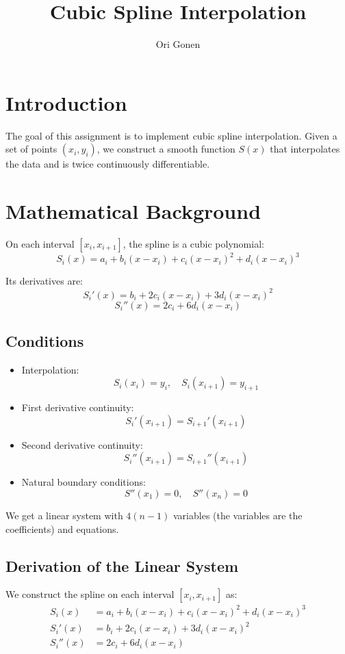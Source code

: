 \documentclass[a4paper,11pt]{article}
\title{Cubic Spline Interpolation}
\author{Ori Gonen}
\date{}
\begin{document}
\maketitle

\section{Introduction}

The goal of this assignment is to implement cubic spline interpolation. Given a set of points $(x_i, y_i)$, we construct a smooth function $S(x)$ that interpolates the data and is twice continuously differentiable.
\section{Mathematical Background}

On each interval $[x_i, x_{i+1}]$, the spline is a cubic polynomial:
\[
S_i(x) = a_i + b_i (x - x_i) + c_i (x - x_i)^2 + d_i (x - x_i)^3
\]

Its derivatives are:
\[
S_i'(x) = b_i + 2c_i(x - x_i) + 3d_i(x - x_i)^2
\]
\[
S_i''(x) = 2c_i + 6d_i(x - x_i)
\]

\subsection*{Conditions}
\begin{itemize}
    \item Interpolation:
    \[
    S_i(x_i) = y_i, \quad S_i(x_{i+1}) = y_{i+1}
    \]

    \item First derivative continuity:
    \[
    S_i'(x_{i+1}) = S_{i+1}'(x_{i+1})
    \]

    \item Second derivative continuity:
    \[
    S_i''(x_{i+1}) = S_{i+1}''(x_{i+1})
    \]

    \item Natural boundary conditions:
    \[
    S''(x_1) = 0, \quad S''(x_n) = 0
    \]
\end{itemize}

We get a linear system with $4(n-1)$ variables (the variables are the coefficients) and equations.

\subsection{Derivation of the Linear System}

We construct the spline on each interval $[x_i, x_{i+1}]$ as:
\begin{align*}
S_i(x) &= a_i + b_i(x - x_i) + c_i(x - x_i)^2 + d_i(x - x_i)^3 \\
S_i'(x) &= b_i + 2c_i(x - x_i) + 3d_i(x - x_i)^2 \\
S_i''(x) &= 2c_i + 6d_i(x - x_i)
\end{align*}
\end{document}

